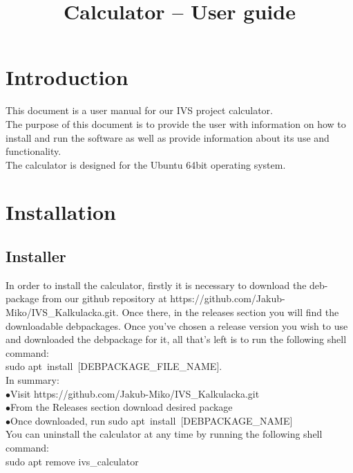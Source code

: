 \documentclass{article}
\title{Calculator -- User guide}
\date{}
\begin{document}
	\maketitle
	
	\tableofcontents
	
	\newpage
	
\section{Introduction}
	This document is a user manual for our IVS project calculator.\\
	The purpose of this document is to provide the user with information on how to install and run the software as well as provide information about its use and functionality.\\
	The calculator is designed for the Ubuntu 64bit operating system.
	\newpage
	
\section{Installation}
	\subsection{Installer}
	In order to install the calculator, firstly it is necessary to download the deb-package from our github repository at https://github.com/Jakub-Miko/IVS\_Kalkulacka.git. Once there, in the releases section you will find the downloadable debpackages. Once you've chosen a release version you wish to use and downloaded the debpackage for it, all that's left is to run the following shell command: \\sudo apt\ install\ [DEBPACKAGE\_FILE\_NAME].\\
	In summary:\\
	$\bullet$Visit https://github.com/Jakub-Miko/IVS\_Kalkulacka.git\\
	$\bullet$From the Releases section download desired package\\
	$\bullet$Once downloaded, run sudo apt\ install\ [DEBPACKAGE\_NAME]\\
	You can uninstall the calculator at any time by running the following shell command:\\
	sudo apt remove ivs\_calculator
\end{document}
